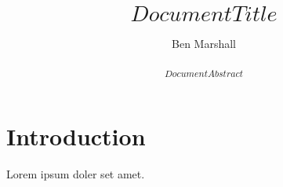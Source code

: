 \documentclass[a4paper,12pt, twoside]{article}
\title{
    \[Document Title\]
    \vspace{5mm}
}
\author{Ben Marshall}
\begin{document}
\maketitle

\begin{abstract}
\[Document Abstract\]
\end{abstract}

\section{Introduction}

Lorem ipsum doler set amet.

\newpage
\nocite{*} %


\end{document}
